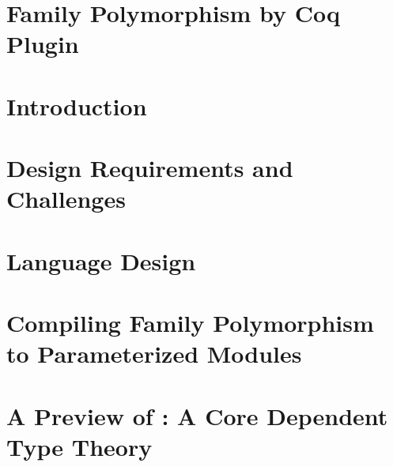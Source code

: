 % 



\section*{Family Polymorphism by Coq Plugin}

\section{Introduction}
\label{sec:intro}



\section{Design Requirements and Challenges}
\label{sec:background+challenge}


\section{Language Design}
\label{sec:lang-design}


\section{Compiling Family Polymorphism to Parameterized Modules}
\label{sec:coqimpl}


\section{A Preview of \TT: A Core Dependent Type Theory}
\label{sec:metatheory2}




